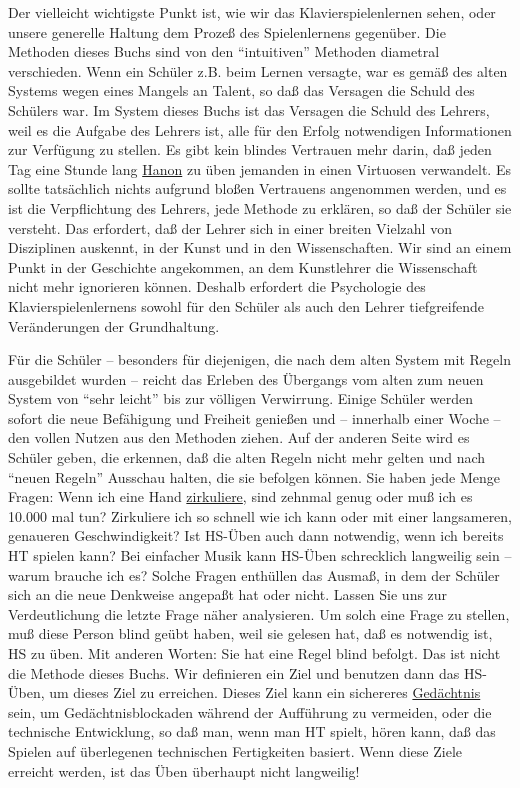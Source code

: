 Der vielleicht wichtigste Punkt ist, wie wir das Klavierspielenlernen sehen, oder unsere generelle Haltung dem Prozeß des Spielenlernens gegenüber.
Die Methoden dieses Buchs sind von den \enquote{intuitiven} Methoden diametral verschieden.
Wenn ein Schüler z.B. beim Lernen versagte, war es gemäß des alten Systems wegen eines Mangels an Talent, so daß das Versagen die Schuld des Schülers war.
Im System dieses Buchs ist das Versagen die Schuld des Lehrers, weil es die Aufgabe des Lehrers ist, alle für den Erfolg notwendigen Informationen zur Verfügung zu stellen.
Es gibt kein blindes Vertrauen mehr darin, daß jeden Tag eine Stunde lang \hyperref[c1iii7h]{Hanon} zu üben jemanden in einen Virtuosen verwandelt.
Es sollte tatsächlich nichts aufgrund bloßen Vertrauens angenommen werden, und es ist die Verpflichtung des Lehrers, jede Methode zu erklären, so daß der Schüler sie versteht.
Das erfordert, daß der Lehrer sich in einer breiten Vielzahl von Disziplinen auskennt, in der Kunst und in den Wissenschaften.
Wir sind an einem Punkt in der Geschichte angekommen, an dem Kunstlehrer die Wissenschaft nicht mehr ignorieren können.
Deshalb erfordert die Psychologie des Klavierspielenlernens sowohl für den Schüler als auch den Lehrer tiefgreifende Veränderungen der Grundhaltung.

Für die Schüler -- besonders für diejenigen, die nach dem alten System mit Regeln ausgebildet wurden -- reicht das Erleben des Übergangs vom alten zum neuen System von \enquote{sehr leicht} bis zur völligen Verwirrung.
Einige Schüler werden sofort die neue Befähigung und Freiheit genießen und -- innerhalb einer Woche -- den vollen Nutzen aus den Methoden ziehen.
Auf der anderen Seite wird es Schüler geben, die erkennen, daß die alten Regeln nicht mehr gelten und nach \enquote{neuen Regeln} Ausschau halten, die sie befolgen können.
Sie haben jede Menge Fragen: Wenn ich eine Hand \hyperref[c1iii2]{zirkuliere}, sind zehnmal genug oder muß ich es 10.000 mal tun?
Zirkuliere ich so schnell wie ich kann oder mit einer langsameren, genaueren Geschwindigkeit?
Ist HS-Üben auch dann notwendig, wenn ich bereits HT spielen kann?
Bei einfacher Musik kann HS-Üben schrecklich langweilig sein -- warum brauche ich es?
Solche Fragen enthüllen das Ausmaß, in dem der Schüler sich an die neue Denkweise angepaßt hat oder nicht.
Lassen Sie uns zur Verdeutlichung die letzte Frage näher analysieren.
Um solch eine Frage zu stellen, muß diese Person blind geübt haben, weil sie gelesen hat, daß es notwendig ist, HS zu üben.
Mit anderen Worten: Sie hat eine Regel blind befolgt.
Das ist nicht die Methode dieses Buchs.
Wir definieren ein Ziel und benutzen dann das HS-Üben, um dieses Ziel zu erreichen.
Dieses Ziel kann ein sichereres \hyperref[c1iii6]{Gedächtnis} sein, um Gedächtnisblockaden während der Aufführung zu vermeiden, oder die technische Entwicklung, so daß man, wenn man HT spielt, hören kann, daß das Spielen auf überlegenen technischen Fertigkeiten basiert.
Wenn diese Ziele erreicht werden, ist das Üben überhaupt nicht langweilig!

